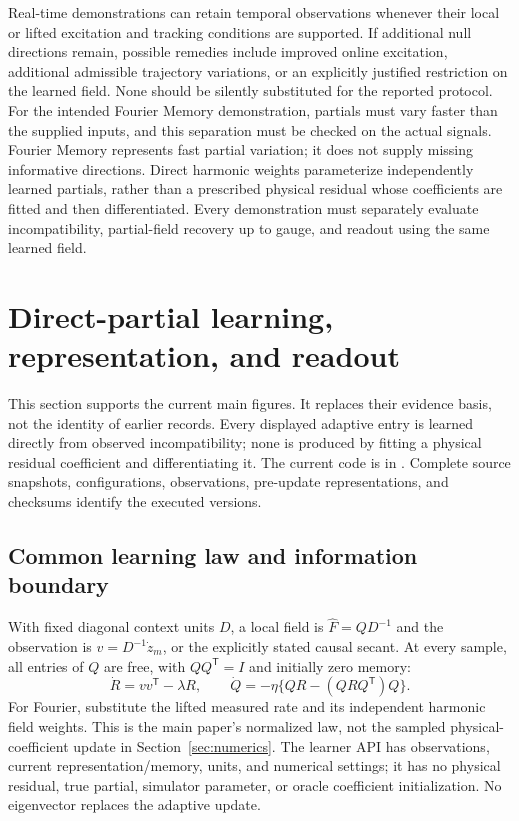 \documentclass[journal]{IEEEtran}
\begin{document}
Real-time demonstrations can retain temporal observations whenever their
local or lifted excitation and tracking conditions are supported. If
additional null directions remain, possible remedies include improved
online excitation, additional admissible trajectory variations, or an
explicitly justified restriction on the learned field. None should be
silently substituted for the reported protocol. For the intended Fourier
Memory demonstration, partials must vary faster than the supplied inputs,
and this separation must be checked on the actual signals. Fourier Memory
represents fast partial variation;
it does not supply missing informative directions. Direct harmonic weights
parameterize independently learned partials, rather than a prescribed
physical residual whose coefficients are fitted and then differentiated.
Every demonstration must separately evaluate incompatibility, partial-field
recovery up to gauge, and readout using the same learned field.
%

\clearpage
\section{Direct-partial learning, representation, and readout}
\label{sec:direct_main}
This section supports the current main figures. It replaces their evidence
basis, not the identity of earlier records. Every displayed adaptive entry
is learned directly from observed incompatibility; none is produced by
fitting a physical residual coefficient and differentiating it. The current
code is in . Complete source snapshots,
configurations, observations, pre-update representations, and checksums
identify the executed versions.

\subsection{Common learning law and information boundary}
With fixed diagonal context units $D$, a local field is
$\widehat F=QD^{-1}$ and the observation is $v=D^{-1}\dot z_m$, or the
explicitly stated causal secant. At every sample, all entries of $Q$ are
free, with $QQ^{\mathsf T}=I$ and initially zero memory:
\begin{equation}
 \dot R=vv^{\mathsf T}-\lambda R,\qquad
 \dot Q=-\eta\{QR-(QRQ^{\mathsf T})Q\}.
 \label{eq:direct_common_law}
\end{equation}
For Fourier, substitute the lifted measured rate and its independent harmonic
field weights. This is the main paper's normalized law, not the sampled
physical-coefficient update in Section~\ref{sec:numerics}. The learner API
has observations, current representation/memory, units, and numerical settings;
it has no physical residual, true partial, simulator parameter, or oracle
coefficient initialization. No eigenvector replaces the adaptive update.
\end{document}
